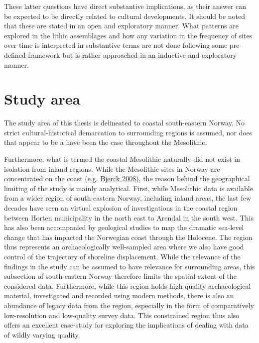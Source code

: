 \documentclass[
  12pt,
  a4paper,
  oneside]{book}
\begin{document}
These latter questions have direct substantive implications, as their answer can be expected to be directly related to cultural developments. It should be noted that these are stated in an open and exploratory manner. What patterns are explored in the lithic assemblages and how any variation in the frequency of sites over time is interpreted in substantive terms are not done following some pre-defined framework but is rather approached in an inductive and exploratory manner.

\hypertarget{study-area}{%
\section{Study area}\label{study-area}}

The study area of this thesis is delineated to coastal south-eastern Norway. No strict cultural-historical demarcation to surrounding regions is assumed, nor does that appear to be a have been the case throughout the Mesolithic.

Furthermore, what is termed the coastal Mesolithic naturally did not exist in isolation from inland regions. While the Mesolithic sites in Norway are concentrated on the coast (e.g. \protect\hyperlink{ref-bjerck2008}{Bjerck 2008}), the reason behind the geographical limiting of the study is mainly analytical. First, while Mesolithic data is available from a wider region of south-eastern Norway, including inland areas, the last few decades have seen an virtual explosion of investigations in the coastal region between Horten municipality in the north east to Arendal in the south west. This has also been accompanied by geological studies to map the dramatic sea-level change that has impacted the Norwegian coast through the Holocene. The region thus represents an archaeologically well-sampled area where we also have good control of the trajectory of shoreline displacement. While the relevance of the findings in the study can be assumed to have relevance for surrounding areas, this subsection of south-eastern Norway therefore limits the spatial extent of the considered data. Furthermore, while this region holds high-quality archaeological material, investigated and recorded using modern methods, there is also an abundance of legacy data from the region, especially in the form of comparatively low-resolution and low-quality survey data. This constrained region thus also offers an excellent case-study for exploring the implications of dealing with data of wildly varying quality.
\end{document}
